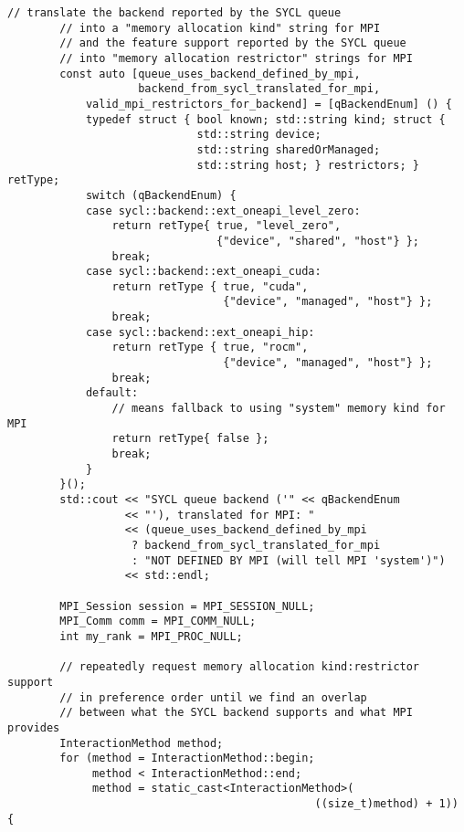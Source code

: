 \begin{example}
\begin{lstlisting}[language={[MPI]C++}]
        // translate the backend reported by the SYCL queue
        // into a "memory allocation kind" string for MPI
        // and the feature support reported by the SYCL queue
        // into "memory allocation restrictor" strings for MPI
        const auto [queue_uses_backend_defined_by_mpi,
                    backend_from_sycl_translated_for_mpi,
            valid_mpi_restrictors_for_backend] = [qBackendEnum] () {
            typedef struct { bool known; std::string kind; struct {
                             std::string device;
                             std::string sharedOrManaged;
                             std::string host; } restrictors; } retType;
            switch (qBackendEnum) {
            case sycl::backend::ext_oneapi_level_zero:
                return retType{ true, "level_zero",
                                {"device", "shared", "host"} };
                break;
            case sycl::backend::ext_oneapi_cuda:
                return retType { true, "cuda",
                                 {"device", "managed", "host"} };
                break;
            case sycl::backend::ext_oneapi_hip:
                return retType { true, "rocm",
                                 {"device", "managed", "host"} };
                break;
            default:
                // means fallback to using "system" memory kind for MPI
                return retType{ false };
                break;
            }
        }();
        std::cout << "SYCL queue backend ('" << qBackendEnum
                  << "'), translated for MPI: "
                  << (queue_uses_backend_defined_by_mpi
                   ? backend_from_sycl_translated_for_mpi
                   : "NOT DEFINED BY MPI (will tell MPI 'system')")
                  << std::endl;

        MPI_Session session = MPI_SESSION_NULL;
        MPI_Comm comm = MPI_COMM_NULL;
        int my_rank = MPI_PROC_NULL;

        // repeatedly request memory allocation kind:restrictor support
        // in preference order until we find an overlap
        // between what the SYCL backend supports and what MPI provides
        InteractionMethod method;
        for (method = InteractionMethod::begin;
             method < InteractionMethod::end;
             method = static_cast<InteractionMethod>(
                                               ((size_t)method) + 1)) {


\end{lstlisting}
\end{example}
